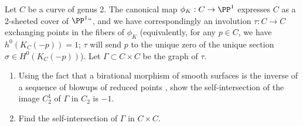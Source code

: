 \begin{exercise}\label{blowup of $J(C)$ at a point}
Let $C$ be a curve of genus 2. The canonical map $\phi_K : C \to
\PP^1$ expresses $C$ as a
%
2-sheeted cover
 of $\PP^1` `$, and we have
correspondingly an involution $\tau : C \to C$ exchanging points in
the fibers of $\phi_K$ (equivalently, for any $p \in C$, we have
$h^0(K_C(-p)) = 1$; $\tau$ will send $p$ to the unique zero of the
unique section $\sigma \in H^0(K_C(-p))$). Let $\Gamma \subset C
\times C$ be the graph of $\tau$.
\begin{enumerate}
\item Using the fact that a birational morphism of smooth surfaces
%
  is the inverse of a sequence of blowups of reduced points
  \cite[Chapter V, Theorem 5.5]{Hartshorne1977},
show the self-intersection of the
  image $C^1_2$ of $\Gamma$ in $C_2$ is $-1$.
\item Find the
self-intersection
%
of $\Gamma$ in $C \times C$.
\end{enumerate}
\end{exercise}


